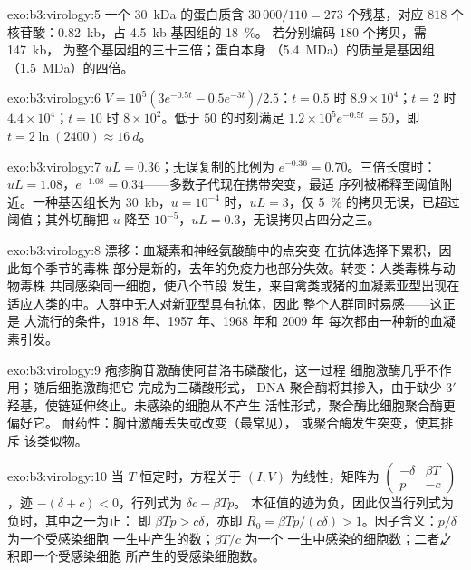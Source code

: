 \begin{solution}{exo:b3:virology:5}
一个 \qty{30}{kDa} 的蛋白质含 $30\,000/110 = 273$ 个残基，对应 $818$
个核苷酸：\qty{0.82}{kb}，占 \qty{4.5}{kb} 基因组的 \qty{18}{\%}。
若分别编码 $180$ 个拷贝，需 \qty{147}{kb}，
为整个基因组的三十三倍；蛋白本身
（\qty{5.4}{MDa}）的质量是基因组（\qty{1.5}{MDa}）的四倍。
\end{solution}

\begin{solution}{exo:b3:virology:6}
$V = 10^{5}(3e^{-0.5t} - 0.5e^{-3t})/2.5$：$t = 0.5$ 时 $8.9\times
10^{4}$；$t = 2$ 时 $4.4\times 10^{4}$；$t = 10$ 时 $8\times 10^{2}$。低于
$50$ 的时刻满足 $1.2\times 10^{5}e^{-0.5t} = 50$，即 $t = 2\ln(2400) \approx
\qty{16}{d}$。
\end{solution}

\begin{solution}{exo:b3:virology:7}
$uL = 0.36$；无误复制的比例为 $e^{-0.36} = 0.70$。三倍长度时：$uL =
1.08$，$e^{-1.08} = 0.34$——多数子代现在携带突变，最适
序列被稀释至阈值附近。一种基因组长为
\qty{30}{kb}，$u = 10^{-4}$ 时，$uL = 3$，仅 \qty{5}{\%}
的拷贝无误，已超过阈值；其外切酶把 $u$ 降至
$10^{-5}$，$uL = 0.3$，无误拷贝占四分之三。
\end{solution}

\begin{solution}{exo:b3:virology:8}
漂移：血凝素和神经氨酸酶中的点突变
在抗体选择下累积，因此每个季节的毒株
部分是新的，去年的免疫力也部分失效。转变：人类毒株与动物毒株
共同感染同一细胞，使八个节段
发生，来自禽类或猪的血凝素亚型出现在
适应人类的中。人群中无人对新亚型具有抗体，因此
整个人群同时易感——这正是
大流行的条件，1918 年、1957 年、1968 年和 2009 年
每次都由一种新的血凝素引发。
\end{solution}

\begin{solution}{exo:b3:virology:9}
疱疹胸苷激酶使阿昔洛韦磷酸化，这一过程
细胞激酶几乎不作用；随后细胞激酶把它
完成为三磷酸形式， DNA 聚合酶将其掺入，由于缺少
3$'$ 羟基，使链延伸终止。未感染的细胞从不产生
活性形式，聚合酶比细胞聚合酶更偏好它。
耐药性：胸苷激酶丢失或改变（最常见），
或聚合酶发生突变，使其排斥
该类似物。
\end{solution}

\begin{solution}{exo:b3:virology:10}
当 $T$ 恒定时，方程关于 $(I, V)$ 为线性，矩阵为
$\begin{pmatrix} -\delta & \beta T \\ p & -c \end{pmatrix}$，迹
$-(\delta + c) < 0$，行列式为 $\delta c - \beta Tp$。
本征值的迹为负，因此仅当行列式为负时，其中之一为正：
即 $\beta Tp > c\delta$，亦即 $R_{0} = \beta
Tp/(c\delta) > 1$。因子含义：$p/\delta$ 为一个受感染细胞
一生中产生的数；$\beta T/c$ 为一个
一生中感染的细胞数；二者之积即一个受感染细胞
所产生的受感染细胞数。
\end{solution}

